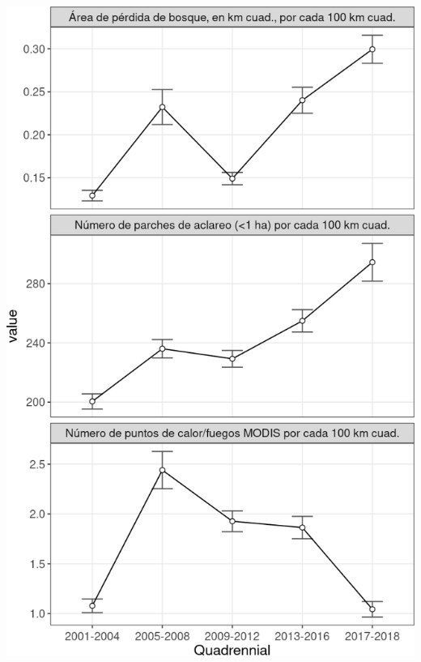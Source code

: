 \documentclass[10pt,landscape,a3paper]{article}
\begin{document}
\begin{center}\includegraphics{img/modelling/aa-eda-ts-15} \end{center}
\end{document}
